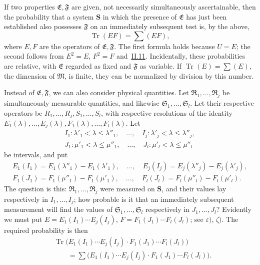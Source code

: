 \documentclass[fontsize=13pt,twoside,openany,headings=normal,parskip=false,bookmarkpackage=false,DIV=calc]{scrbook}
\begin{document}
If two properties $\mathfrak E,\mathfrak F$ are given, not necessarily simultaneously ascertainable, then the probability that a system $\boldsymbol{S}$ in which the presence of $\mathfrak E$ has just been established also possesses $\mathfrak F$ on an immediately subsequent test is, by the above,
\[
\operatorname{Tr}(EF)=\sum(EF),
\]
where $E,F$ are the operators of $\mathfrak E,\mathfrak F$. The first formula holds because $U=E$; the second follows from $E^2=E$, $F^2=F$ and~\hyperref[sec:II.11]{II.11}. Incidentally, these probabilities
\hypertarget{origpage-183}{}%
are relative, with $\mathfrak E$ regarded as fixed and $\mathfrak F$ as variable. If $\operatorname{Tr}(E)=\sum(E)$, the dimension of $\mathfrak M$, is finite, they can be normalized by division by this number.

Instead of $\mathfrak E,\mathfrak F$, we can also consider physical quantities. Let $\mathfrak R_1,\ldots,\mathfrak R_j$ be simultaneously measurable quantities, and likewise $\mathfrak S_1,\ldots,\mathfrak S_l$. Let their respective operators be $R_1,\ldots,R_j,S_1,\ldots,S_l$, with respective resolutions of the identity $E_1(\lambda),\ldots,E_j(\lambda),F_1(\lambda),\ldots,F_l(\lambda)$. Let
\begin{gather*}
I_1:\lambda'_1<\lambda\leq\lambda''_1,\quad\ldots,\quad I_j:\lambda'_j<\lambda\leq\lambda''_j,\\
J_1:\mu'_1<\lambda\leq\mu''_1,\quad\ldots,\quad J_l:\mu'_l<\lambda\leq\mu''_l
\end{gather*}
be intervals, and put
\begin{gather*}
E_1(I_1)=E_1(\lambda''_1)-E_1(\lambda'_1),\quad\ldots,\quad E_j(I_j)=E_j(\lambda''_j)-E_j(\lambda'_j),\\
F_1(J_1)=F_1(\mu''_1)-F_1(\mu'_1),\quad\ldots,\quad F_l(J_l)=F_l(\mu''_l)-F_l(\mu'_l).
\end{gather*}
The question is this: $\mathfrak R_1,\ldots,\mathfrak R_j$ were measured on $\boldsymbol{S}$, and their values lay respectively in $I_1,\ldots,I_j$; how probable is it that an immediately subsequent measurement will find the values of $\mathfrak S_1,\ldots,\mathfrak S_l$ respectively in $J_1,\ldots,J_l$? Evidently we must put $E=E_1(I_1)\cdots E_j(I_j)$, $F=F_1(J_1)\cdots F_l(J_l)$; see \hyperref[post:III.5.epsilon]{$\varepsilon)$}, \hyperref[post:III.5.zeta]{$\zeta)$}. The required probability is then
\begin{align*}
&\operatorname{Tr}\bigl(E_1(I_1)\cdots E_j(I_j)\cdot F_1(J_1)\cdots F_l(J_l)\bigr)\\
&\qquad=\sum\bigl(E_1(I_1)\cdots E_j(I_j)\cdot F_1(J_1)\cdots F_l(J_l)\bigr).
\end{align*}
\end{document}

